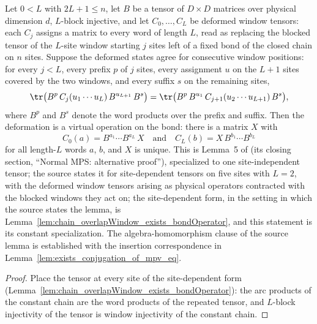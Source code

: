 \begin{lemma}%
    \label{lem:overlapWindow_exists_bondOperator}
    \leanok
    Let $0 < L$ with $2L + 1 \le n$, let $B$ be a tensor of $D \times D$
    matrices over physical dimension $d$, $L$-block injective, and let
    $C_0, \ldots, C_L$ be deformed window tensors: each $C_j$ assigns a
    matrix to every word of length $L$, read as replacing the blocked
    tensor of the $L$-site window starting $j$ sites left of a fixed bond
    of the closed chain on $n$ sites.  Suppose the deformed states agree
    for consecutive window positions: for every $j < L$, every prefix $p$
    of $j$ sites, every assignment $u$ on the $L + 1$ sites covered by the
    two windows, and every suffix $s$ on the remaining sites,
    \[
        \tr\bigl(B^{p}\, C_j(u_1 \cdots u_L)\, B^{u_{L+1}}\, B^{s}\bigr)
        = \tr\bigl(B^{p}\, B^{u_1}\, C_{j+1}(u_2 \cdots u_{L+1})\,
        B^{s}\bigr),
    \]
    where $B^{p}$ and $B^{s}$ denote the word products over the prefix and
    suffix.  Then the deformation is a virtual operation on the bond: there
    is a matrix $X$ with
    \[
        C_0(a) = B^{a_1} \cdots B^{a_L}\, X
        \quad\text{and}\quad
        C_L(b) = X\, B^{b_1} \cdots B^{b_L}
    \]
    for all length-$L$ words $a$, $b$, and $X$ is unique.  This is Lemma~5
    of \cite{Molnar2018NormalPEPS} (its closing section, ``Normal MPS:
    alternative proof''), specialized to one site-independent tensor; the
    source states it for site-dependent tensors on five sites with $L = 2$,
    with the deformed window tensors arising as physical operators
    contracted with the blocked windows they act on; the site-dependent
    form, in the setting in which the source states the lemma, is
    Lemma~\ref{lem:chain_overlapWindow_exists_bondOperator}, and this
    statement is its constant specialization.  The
    algebra-homomorphism clause of the source lemma is established with the
    insertion correspondence in
    Lemma~\ref{lem:exists_conjugation_of_mpv_eq}.
\end{lemma}
\begin{proof}\leanok
    Place the tensor at every site of the site-dependent form
    (Lemma~\ref{lem:chain_overlapWindow_exists_bondOperator}): the arc
    products of the constant chain are the word products of the repeated
    tensor, and $L$-block injectivity of the tensor is window injectivity
    of the constant chain.
\end{proof}

